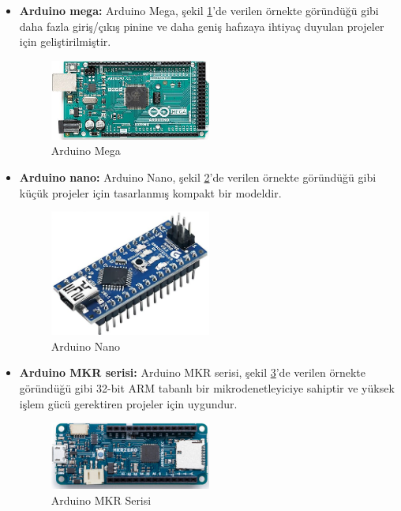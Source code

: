 \begin{itemize}
\item \textbf{Arduino mega:} Arduino Mega, şekil \ref{fig:8}'de verilen örnekte göründüğü gibi daha fazla giriş/çıkış pinine ve daha geniş hafızaya ihtiyaç duyulan projeler için geliştirilmiştir.
\begin{figure}[H]
\centering
\includegraphics[width=0.50\textwidth]{Resimler/8.png}
\caption{Arduino Mega}
\label{fig:8}
\end{figure}
{}
\item \textbf{Arduino nano:} Arduino Nano, şekil \ref{fig:9}'de verilen örnekte göründüğü gibi küçük projeler için tasarlanmış kompakt bir modeldir.
\begin{figure}[H]
\centering
\includegraphics[width=0.50\textwidth]{Resimler/9.png}
\caption{Arduino Nano}
\label{fig:9}
\end{figure}

\item \textbf{Arduino MKR serisi:} Arduino MKR serisi, şekil \ref{fig:10}'de verilen örnekte göründüğü gibi 32-bit ARM tabanlı bir mikrodenetleyiciye sahiptir ve yüksek işlem gücü gerektiren projeler için uygundur.
\begin{figure}[H]
\centering
\includegraphics[width=0.50\textwidth]{Resimler/10}
\caption{Arduino MKR Serisi}
\label{fig:10}
\end{figure}

\end{itemize}

